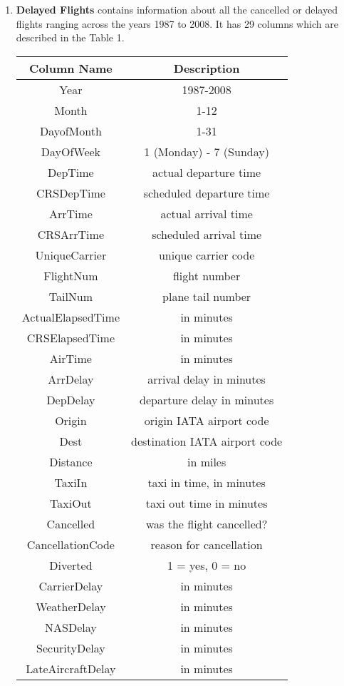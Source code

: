 \documentclass[9pt,twocolumn,twoside]{../../styles/osajnl}
\begin{document}
\begin{enumerate}
    \item \textbf{Delayed Flights} contains information about all the cancelled or delayed flights ranging across the years 1987 to 2008. It has 29 columns which are described in the Table 1.
    
    \begin{table}
    \begin{tabular}{|c|c|}
        \hline
        \textbf{Column Name} & \textbf{Description} \\ \hline
        Year & 1987-2008  \\ \hline
        Month & 1-12  \\ \hline
        DayofMonth & 1-31  \\ \hline
        DayOfWeek & 1 (Monday) - 7 (Sunday)  \\ \hline
        DepTime & actual departure time   \\ \hline    
        CRSDepTime & scheduled departure time  \\ \hline
        ArrTime & actual arrival time \\ \hline
        CRSArrTime & scheduled arrival time  \\ \hline
        UniqueCarrier & unique carrier code  \\ \hline
        FlightNum & flight number  \\ \hline
        TailNum & plane tail number  \\ \hline
        ActualElapsedTime & in minutes  \\ \hline
        CRSElapsedTime & in minutes  \\ \hline
        AirTime & in minutes  \\ \hline
        ArrDelay & arrival delay in minutes  \\ \hline
        DepDelay & departure delay in minutes  \\ \hline
        Origin & origin IATA airport code  \\ \hline
        Dest & destination IATA airport code  \\ \hline
        Distance & in miles  \\ \hline
        TaxiIn & taxi in time, in minutes  \\ \hline
        TaxiOut & taxi out time in minutes  \\ \hline
        Cancelled & was the flight cancelled?  \\ \hline
        CancellationCode & reason for cancellation  \\ \hline
        Diverted & 1 = yes, 0 = no  \\ \hline
        CarrierDelay & in minutes  \\ \hline
        WeatherDelay & in minutes  \\ \hline
        NASDelay & in minutes  \\ \hline
        SecurityDelay & in minutes  \\ \hline
        LateAircraftDelay & in minutes  \\ \hline


\end{tabular}
\end{table}
\end{enumerate}
\end{document}
